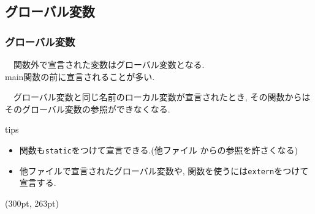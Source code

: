 \documentclass[dvipdfmx]{beamer}
\begin{document}
\subsection{グローバル変数}
\begin{frame}[label=54]
    \frametitle{グローバル変数}
    　関数外で宣言された変数はグローバル変数となる.\\
    main関数の前に宣言されることが多い.
    \vspace{-15pt}
    \begin{table}
    \centering
    \end{table}
    　グローバル変数と同じ名前のローカル変数が宣言されたとき,
        その関数からはそのグローバル変数の参照ができなくなる.
    \begin{itembox}[l]{tips}
        \begin{itemize}
            \item 関数も\texttt{static}をつけて宣言できる.(他ファイル
                からの参照を許さくなる)
            \vspace{-3pt}
            \item 他ファイルで宣言されたグローバル変数や,
                関数を使うには\texttt{extern}をつけて宣言する.
        \end{itemize}
    \end{itembox}
    \begin{textblock*}{0.3\linewidth}(300pt, 263pt)
    \hyperlink{53}{}
    \space
    \hyperlink{55}{}
    \end{textblock*}
\end{frame}
\end{document}
